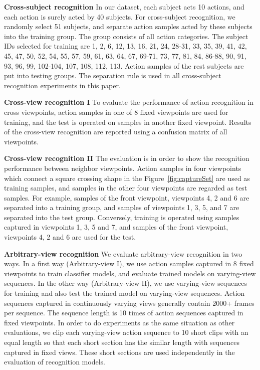 \documentclass[journal]{IEEEtran}
\begin{document}
\textbf{Cross-subject recognition} In our dataset, each subject acts 10 actions, and each action is surely acted by 40 subjects. For cross-subject recognition, we randomly select 51 subjects, and separate action samples acted by these subjects into the training group. The group consists of all action categories. The subject IDs selected for training are 1, 2, 6, 12, 13, 16, 21, 24, 28-31, 33, 35, 39, 41, 42, 45, 47, 50, 52, 54, 55, 57, 59, 61, 63, 64, 67, 69-71, 73, 77, 81, 84, 86-88, 90, 91, 93, 96, 99, 102-104, 107, 108, 112, 113.
Action samples of the rest subjects are put into testing groups. The separation rule is used in all cross-subject recognition experiments in this paper.

\textbf{Cross-view recognition I} To evaluate the performance of action recognition in cross viewpoints, action samples in one of 8 fixed viewpoints are used for training, and the test is operated on samples in another fixed viewpoint. Results of the cross-view recognition are reported using a confusion matrix of all viewpoints.

\textbf{Cross-view recognition II} The evaluation is in order to show the recognition performance between neighbor viewpoints. Action samples in four viewpoints which connect a square crossing shape in the Figure~\ref{fig:captureSet} are used as training samples, and samples in the other four viewpoints are regarded as test samples. For example, samples of the front viewpoint, viewpoints 4, 2 and 6 are separated into a training group, and samples of viewpoints 1, 3, 5, and 7 are separated into the test group. Conversely, training is operated using samples captured in viewpoints 1, 3, 5 and 7, and samples of the front viewpoint, viewpoints 4, 2 and 6 are used for the test.

\textbf{Arbitrary-view recognition} We evaluate arbitrary-view recognition in two ways. In a first way (Arbitrary-view I), we use action samples captured in 8 fixed viewpoints to train classifier models, and evaluate trained models on varying-view sequences. In the other way (Arbitrary-view II), we use varying-view sequences for training and also test the trained model on varying-view sequences. Action sequences captured in continuously varying views generally contain 2000+ frames per sequence. The sequence length is 10 times of action sequences captured in fixed viewpoints. In order to do experiments as the same situation as other evaluations, we clip each varying-view action sequence to 10 short clips with an equal length so that each short section has the similar length with sequences captured in fixed views. These short sections are used independently in the evaluation of recognition models.
\end{document}
